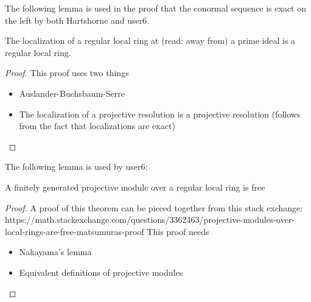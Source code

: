 The following lemma is used in the proof that the 
conormal sequence is exact on the left by both 
Hartshorne and user6.

\begin{lemma} \label{lem:regular_localizes}
	The localization of a regular local ring at (read: away from) a prime 
	ideal is a regular local ring.
\end{lemma}

\begin{proof}
	This proof uses two things
	\begin{itemize}
		\item Auslander-Buchsbaum-Serre
		\item The localization of a projective resolution
			is a projective resolution
			(follows from the fact that localizations are exact)
	\end{itemize}
\end{proof}

The following lemma is used by user6:

\begin{lemma} \label{lem:fin_gen_proj_over_local_is_free}
	A finitely generated projective module 
	over a regular local ring is free
\end{lemma}


\begin{proof}
	A proof of this theorem can be pieced together from this
	stack exchange:
	https://math.stackexchange.com/questions/3362463/projective-modules-over-local-rings-are-free-matsumuras-proof
	This proof needs
	\begin{itemize}
		\item Nakayama's lemma
		\item Equivalent definitions of projective modules
	\end{itemize}
\end{proof}




